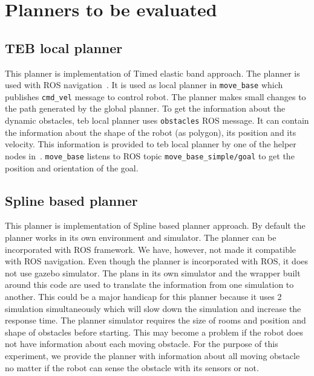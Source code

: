 \section{Planners to be evaluated}%
\label{sec:planners_to_be_evaluated}

\subsection{TEB local planner}%
\label{sub:teb_local_planner}
This planner\cite{tebLocalPlanner} is implementation of Timed elastic band 
approach\cite{rosmann2015planning}.
The planner is used with ROS navigation~\cite{rosnavigation}. It is used as local
planner in \texttt{move\_base} which publishes \texttt{cmd\_vel} message to control robot. 
The planner makes small changes to the path generated by the global planner.
To get the information about the dynamic obstacles, teb local planner uses \texttt{obstacles} 
ROS message. It can contain the information about the shape of the robot (as polygon), its
position and its velocity. This information is provided to teb local planner by one of the
helper nodes in~\cite{movingObstacleGazebo}.
\texttt{move\_base} listens to ROS topic \texttt{move\_base\_simple/goal} to get the position
and orientation of the goal.

\subsection{Spline based planner}%
\label{sub:spline_based_planner}
This planner\cite{omgtools} is implementation of Spline based planner approach\cite{mercy2017spline}.
By default the planner works in its own environment and simulator. The planner can be 
incorporated with ROS framework\cite{p3dxMotionplanner}. We have, however, not made it 
compatible with ROS navigation.
Even though the planner is incorporated with ROS, it does not use gazebo simulator. The 
plans in its own simulator and the wrapper built around this code are used to translate the 
information from one simulation to another. This could be a major handicap for this planner 
because it uses 2 simulation simultaneously which will slow down the simulation and increase
the response time.
The planner simulator requires the size of rooms and position and shape of obstacles before
starting. This may become a problem if the robot does not have information about each moving
obstacle. For the purpose of this experiment, we provide the planner with information about
all moving obstacle no matter if the robot can sense the obstacle with its sensors or not.

